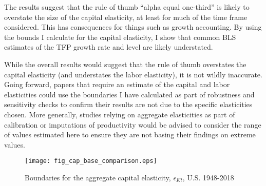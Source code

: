 \documentclass[11pt]{article}
\begin{document}
The results suggest that the rule of thumb ``alpha equal one-third'' is likely to overstate the size of the capital elasticity, at least for much of the time frame considered. This has consequences for things such as growth accounting. By using the bounds I calculate for the capital elasticity, I show that common BLS estimates of the TFP growth rate and level are likely understated.

While the overall results would suggest that the rule of thumb overstates the capital elasticity (and understates the labor elasticity), it is not wildly inaccurate. Going forward, papers that require an estimate of the capital and labor elasticities could use the boundaries I have calculated as part of robustness and sensitivity checks to confirm their results are not due to the specific elasticities chosen. More generally, studies relying on aggregate elasticities as part of calibration or imputations of productivity would be advised to consider the range of values estimated here to ensure they are not basing their findings on extreme values.

\newpage

\clearpage

\onehalfspacing
{\small


}

\clearpage

\begin{figure}[!htb]
\begin{center}
\caption{Boundaries for the aggregate capital elasticity, $\epsilon_{Kt}$, U.S. 1948-2018}
\label{FIG_cap_comparison}
\texttt{[image: fig\_cap\_base\_comparison.eps]}
\end{center}
\vspace{-.5cm}
\end{figure}
\end{document}
